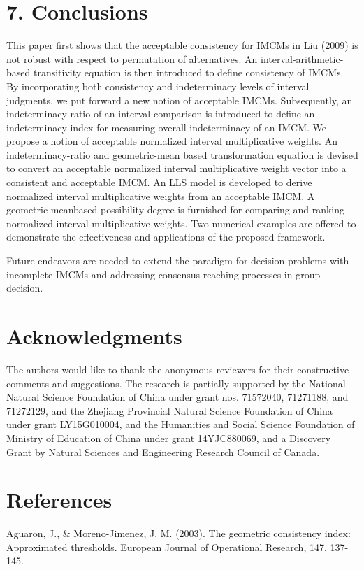\documentclass[10pt]{article}
\begin{document}
\section*{7. Conclusions}
This paper first shows that the acceptable consistency for IMCMs in Liu (2009) is not robust with respect to permutation of alternatives. An interval-arithmetic-based transitivity equation is then introduced to define consistency of IMCMs. By incorporating both consistency and indeterminacy levels of interval judgments, we put forward a new notion of acceptable IMCMs. Subsequently, an indeterminacy ratio of an interval comparison is introduced to define an indeterminacy index for measuring overall indeterminacy of an IMCM. We propose a notion of acceptable normalized interval multiplicative weights. An indeterminacy-ratio and geometric-mean based transformation equation is devised to convert an acceptable normalized interval multiplicative weight vector into a consistent and acceptable IMCM. An LLS model is developed to derive normalized interval multiplicative weights from an acceptable IMCM. A geometric-meanbased possibility degree is furnished for comparing and ranking normalized interval multiplicative weights. Two numerical examples are offered to demonstrate the effectiveness and applications of the proposed framework.

Future endeavors are needed to extend the paradigm for decision problems with incomplete IMCMs and addressing consensus reaching processes in group decision.

\section*{Acknowledgments}
The authors would like to thank the anonymous reviewers for their constructive comments and suggestions. The research is partially supported by the National Natural Science Foundation of China under grant nos. 71572040, 71271188, and 71272129, and the Zhejiang Provincial Natural Science Foundation of China under grant LY15G010004, and the Humanities and Social Science Foundation of Ministry of Education of China under grant 14YJC880069, and a Discovery Grant by Natural Sciences and Engineering Research Council of Canada.

\section*{References}
Aguaron, J., \& Moreno-Jimenez, J. M. (2003). The geometric consistency index: Approximated thresholds. European Journal of Operational Research, 147, 137-145.
\end{document}
